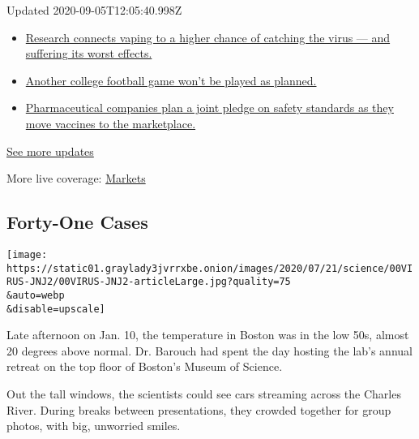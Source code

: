 Updated 2020-09-05T12:05:40.998Z

\begin{itemize}
\tightlist
\item
  \href{https://www.nytimes3xbfgragh.onion/2020/09/04/world/covid-19-coronavirus.html?action=click\&pgtype=Article\&state=default\&region=MAIN_CONTENT_1\&context=storylines_live_updates\#link-1654f6ad}{Research
  connects vaping to a higher chance of catching the virus --- and
  suffering its worst effects.}
\item
  \href{https://www.nytimes3xbfgragh.onion/2020/09/04/world/covid-19-coronavirus.html?action=click\&pgtype=Article\&state=default\&region=MAIN_CONTENT_1\&context=storylines_live_updates\#link-52e4198a}{Another
  college football game won't be played as planned.}
\item
  \href{https://www.nytimes3xbfgragh.onion/2020/09/04/world/covid-19-coronavirus.html?action=click\&pgtype=Article\&state=default\&region=MAIN_CONTENT_1\&context=storylines_live_updates\#link-181cef0}{Pharmaceutical
  companies plan a joint pledge on safety standards as they move
  vaccines to the marketplace.}
\end{itemize}

\href{https://www.nytimes3xbfgragh.onion/2020/09/04/world/covid-19-coronavirus.html?action=click\&pgtype=Article\&state=default\&region=MAIN_CONTENT_1\&context=storylines_live_updates}{See
more updates}

More live coverage:
\href{https://www.nytimes3xbfgragh.onion/live/2020/09/04/business/stock-market-today-coronavirus?action=click\&pgtype=Article\&state=default\&region=MAIN_CONTENT_1\&context=storylines_live_updates}{Markets}

\hypertarget{forty-one-cases}{%
\subsection{Forty-One Cases}\label{forty-one-cases}}

\texttt{[image: https://static01.graylady3jvrrxbe.onion/images/2020/07/21/science/00VIRUS-JNJ2/00VIRUS-JNJ2-articleLarge.jpg?quality=75\\\&auto=webp\\\&disable=upscale]}

Late afternoon on Jan. 10, the temperature in Boston was in the low 50s,
almost 20 degrees above normal. Dr. Barouch had spent the day hosting
the lab's annual retreat on the top floor of Boston's Museum of Science.

Out the tall windows, the scientists could see cars streaming across the
Charles River. During breaks between presentations, they crowded
together for group photos, with big, unworried smiles.

